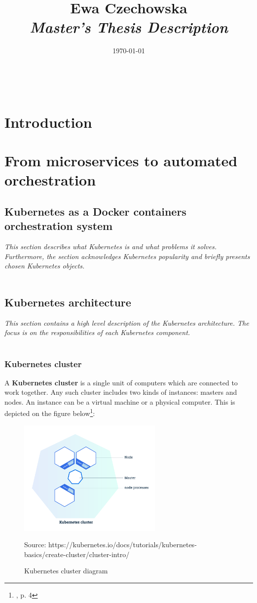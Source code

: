 \documentclass[12pt]{article}
\title{
{\small Ewa Czechowska } \\
\bf\textit{ Master’s Thesis Description } \\
\vspace{4cm}}
\date{\today}
\begin{document}
\maketitle
~\vspace{8cm}
\newpage

\section{Introduction}
\section{From microservices to automated orchestration}
\subsection{Kubernetes as a Docker containers orchestration system}
\textit{This section describes what Kubernetes is and what problems it solves. Furthermore, the section acknowledges Kubernetes popularity and briefly presents chosen Kubernetes objects.}
~\\
~\\
\subsection{Kubernetes architecture}
\textit{This section contains a high level description of the Kubernetes architecture. The focus is on the responsibilities of each Kubernetes component.}
~\\
~\\
\subsubsection{Kubernetes cluster}
A \textbf{Kubernetes cluster} is a single unit of computers which are connected to work together. Any such cluster includes two kinds of instances: masters and nodes. An instance can be a virtual machine or a physical computer. This is depicted on the figure below\footnote{\cite{k8s-cluster}, p. 4}:
\begin{figure}[H]
    \centering
    \includegraphics[width=7cm]{figures/cluster.png}
    \label{fig:cluster}
    \caption{Kubernetes cluster diagram}
    \small{Source: https://kubernetes.io/docs/tutorials/kubernetes-basics/create-cluster/cluster-intro/}
\end{figure}
\end{document}
